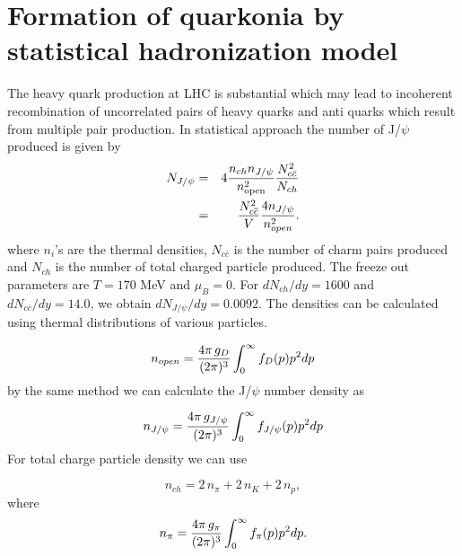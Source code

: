 \documentclass[aps,prc,preprint,superscriptaddress,showpacs,showkeys]{revtex4-1}
\begin{document}




\section{Formation of quarkonia  by statistical hadronization model}\label{SHM}
The heavy quark production at LHC is substantial which may lead to incoherent 
recombination of uncorrelated pairs of heavy quarks and anti quarks which result 
from multiple pair production. In statistical approach \cite{MUNZI} the number of 
J/$\psi$ produced is given by 
\begin{eqnarray}
N_{J/\psi}  &= &4 {n_{ch} n_{J/\psi} \over n_{\rm open}^2}  {N_{c\bar c}^2 \over N_{ch} }\\
          &= &\frac{N_{c\overline{c}}^{2}}{V}\frac{4n_{J/\psi}}{n_{open}^{2}}.
\end{eqnarray}
where $n_i$'s are the thermal densities, $N_{c\bar c}$ is the number of charm pairs produced 
and $N_{ch}$ is the number of total charged particle produced. 
The freeze out parameters are $T=170$ MeV and $\mu_B = 0$. For
$dN_{ch}/dy = 1600$ \cite{MULT} and $dN_{c \bar c} /dy = 14.0$, we obtain $dN_{J/\psi} /dy = 0.0092$.
The densities can be calculated using thermal distributions of various particles.

\begin{equation}
n_{open} = {4\pi \,g_{D} \over (2\pi)^{3}} \int_{0}^{\infty} f_{D}(p)p^{2}dp
\end{equation}
by the same method we can calculate the J/$\psi$ number density as

\begin{equation}
n_{J/\psi} = {4\pi \,g_{J/\psi} \over (2\pi)^{3}} \int_{0}^{\infty} f_{J/\psi}(p)p^{2}dp 
\end{equation}
 For total charge particle density we can use 

\begin{equation}
n_{ch} = 2 \,n_{\pi} + 2\, n_{K} + 2\, n_{p},
\end{equation}
where
\begin{equation}
n_{\pi} = {4\pi \,g_{\pi} \over (2\pi)^{3}} \int_{0}^{\infty} f_{\pi}(p)p^{2}dp.
\end{equation}
\end{document}
